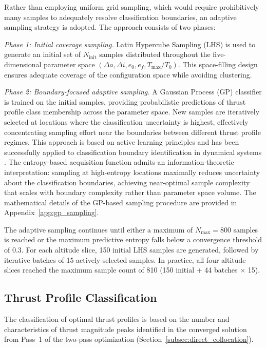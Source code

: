 \documentclass[a4paper,fleqn]{cas-dc}
\let\origsubsection\subsection
\renewcommand{\subsection}{\FloatBarrier\origsubsection}
\begin{document}
Rather than employing uniform grid sampling, which would require prohibitively many samples to adequately resolve classification boundaries, an adaptive sampling strategy is adopted. The approach consists of two phases:

\textit{Phase 1: Initial coverage sampling.} Latin Hypercube Sampling (LHS) is used to generate an initial set of $N_{\text{init}}$ samples distributed throughout the five-dimensional parameter space $(\Delta a, \Delta i, e_0, e_f, T_{\max}/T_0)$. This space-filling design ensures adequate coverage of the configuration space while avoiding clustering.

\textit{Phase 2: Boundary-focused adaptive sampling.} A Gaussian Process (GP) classifier is trained on the initial samples, providing probabilistic predictions of thrust profile class membership across the parameter space. New samples are iteratively selected at locations where the classification uncertainty is highest, effectively concentrating sampling effort near the boundaries between different thrust profile regimes. This approach is based on active learning principles \citep{Settles2009} and has been successfully applied to classification boundary identification in dynamical systems \citep{Lee2023}. The entropy-based acquisition function admits an information-theoretic interpretation: sampling at high-entropy locations maximally reduces uncertainty about the classification boundaries, achieving near-optimal sample complexity that scales with boundary complexity rather than parameter space volume. The mathematical details of the GP-based sampling procedure are provided in Appendix~\ref{app:gp_sampling}.

The adaptive sampling continues until either a maximum of $N_{\text{max}} = 800$ samples is reached or the maximum predictive entropy falls below a convergence threshold of 0.3. For each altitude slice, 150 initial LHS samples are generated, followed by iterative batches of 15 actively selected samples. In practice, all four altitude slices reached the maximum sample count of 810 (150 initial + 44 batches $\times$ 15).

\subsection{Thrust Profile Classification}\label{subsec:classification}

The classification of optimal thrust profiles is based on the number and characteristics of thrust magnitude peaks identified in the converged solution from Pass~1 of the two-pass optimization (Section~\ref{subsec:direct_collocation}).
\end{document}
